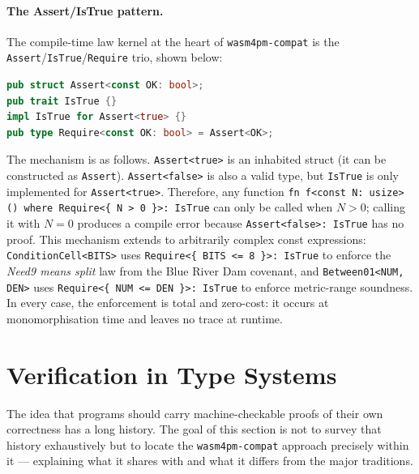 \paragraph{The Assert/IsTrue pattern.}
The compile-time law kernel at the heart of \texttt{wasm4pm-compat} is the
\texttt{Assert}/\texttt{IsTrue}/\texttt{Require} trio, shown below:

\begin{lstlisting}[language=Rust, caption={Assert/IsTrue compile-time law machinery from
  \texttt{src/law.rs}. \texttt{Assert<true>} is inhabited; \texttt{Assert<false>}
  is not. A where-bound \texttt{Require<\{EXPR\}>: IsTrue} becomes a compile
  error when \texttt{EXPR} evaluates to \texttt{false}.},
  label={lst:bg-assert-istrue}]
pub struct Assert<const OK: bool>;
pub trait IsTrue {}
impl IsTrue for Assert<true> {}
pub type Require<const OK: bool> = Assert<OK>;
\end{lstlisting}

The mechanism is as follows. \texttt{Assert<true>} is an inhabited struct
(it can be constructed as \texttt{Assert}). \texttt{Assert<false>} is also
a valid type, but \texttt{IsTrue} is only implemented for \texttt{Assert<true>}.
Therefore, any function \texttt{fn f<const N: usize>() where Require<\{ N > 0
\}>: IsTrue} can only be called when $N > 0$; calling it with $N = 0$ produces
a compile error because \texttt{Assert<false>: IsTrue} has no proof. This
mechanism extends to arbitrarily complex const expressions:
\texttt{ConditionCell<BITS>} uses \texttt{Require<\{ BITS <= 8 \}>: IsTrue}
to enforce the \emph{Need9 means split} law from the Blue River Dam covenant,
and \texttt{Between01<NUM, DEN>} uses \texttt{Require<\{ NUM <= DEN \}>: IsTrue}
to enforce metric-range soundness. In every case, the enforcement is total and
zero-cost: it occurs at monomorphisation time and leaves no trace at runtime.

\section{Verification in Type Systems}
\label{sec:bg-verification}

The idea that programs should carry machine-checkable proofs of their own
correctness has a long history. The goal of this section is not to survey that
history exhaustively but to locate the \texttt{wasm4pm-compat} approach
precisely within it --- explaining what it shares with and what it differs from
the major traditions.

